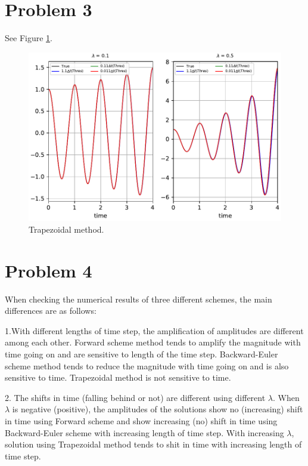 \documentclass[12pt]{article}%
\begin{document}
\section{Problem 3}
See Figure \ref{fig:fig2}.
\begin{figure}
    \centering
    \includegraphics{figs/trapezoidal.pdf}
    \caption{Trapezoidal method.}
    \label{fig:fig2}
\end{figure}
\section{Problem 4}


When checking the numerical results of three different schemes, the main differences are as follows:

1.With different lengths of time step, the amplification of amplitudes are different among each other. Forward scheme method tends to amplify the magnitude with time going on and are sensitive to length of the time step. Backward-Euler scheme method tends to reduce the magnitude with time going on and is also sensitive to time. Trapezoidal method is not sensitive to time.

2. The shifts in time (falling behind or not) are different using different $\lambda$. When $\lambda$ is negative (positive), the amplitudes of the solutions show no (increasing) shift in time using Forward scheme and  show increasing (no) shift in time using Backward-Euler scheme with increasing length of time step. With increasing $\lambda$, solution using Trapezoidal method tends to shit in time with increasing length of time step.
\end{document}
